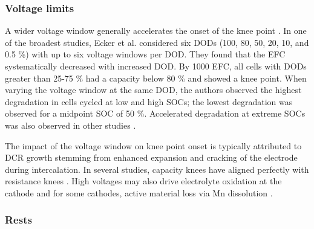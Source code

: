 \documentclass{article}
\begin{document}
\subsubsection{Voltage limits} 
A wider voltage window generally accelerates the onset of the knee point \cite{ecker_calendar_2014, pfrang_long-term_2018, klett_non-uniform_2014, ma_novel_2019, petzl_lithium_2015, schuster_nonlinear_2015}. In one of the broadest studies, Ecker et al. \cite{ecker_calendar_2014} considered six DODs (100, 80, 50, 20, 10, and 0.5 \%) with up to six voltage windows per DOD. They found that the EFC systematically decreased with increased DOD. By 1000 EFC, all cells with DODs greater than 25-75 \% had a capacity below 80 \% and showed a knee point. When varying the voltage window at the same DOD, the authors observed the highest degradation in cells cycled at low and high SOCs; the lowest degradation was observed for a midpoint SOC of 50 \%. Accelerated degradation at extreme SOCs was also observed in other studies \cite{aiken_accelerated_2020,ma_novel_2019, zhu_investigation_2021}.

The impact of the voltage window on knee point onset is typically attributed to DCR growth stemming from enhanced expansion and cracking of the electrode during intercalation. In several studies, capacity knees have aligned perfectly with resistance knees \cite{ecker_calendar_2014, klett_non-uniform_2014, schuster_nonlinear_2015, zhu_investigation_2021}. High voltages may also drive electrolyte oxidation at the cathode \cite{aiken_accelerated_2020} and for some cathodes, active material loss via Mn dissolution \cite{ma_novel_2019}. 



\subsubsection{Rests}
\end{document}
